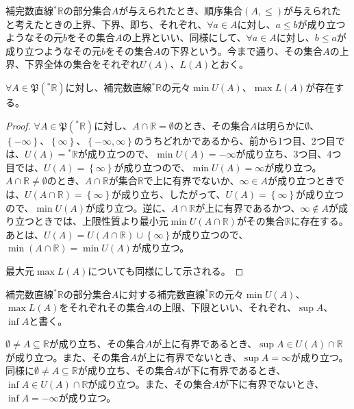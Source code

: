 \documentclass[dvipdfmx]{jsarticle}
\begin{document}
\begin{dfn}
補完数直線${}^{*}\mathbb{R}$の部分集合$A$が与えられたとき、順序集合$(A, \leq )$が与えられたと考えたときの上界、下界、即ち、それぞれ、$\forall a \in A$に対し、$a \leq b$が成り立つようなその元$b$をその集合$A$の上界といい、同様にして、$\forall a \in A$に対し、$b \leq a$が成り立つようなその元$b$をその集合$A$の下界という。今まで通り、その集合$A$の上界、下界全体の集合をそれぞれ$U(A)$、$L(A)$とおく。
\end{dfn}
\begin{thm}\label{4.1.3.1}
$\forall A \in \mathfrak{P}\left({}^{*}\mathbb{R} \right)$に対し、補完数直線${}^{*}\mathbb{R}$の元々$\min{U(A)}$、$\max{L(A)}$が存在する。
\end{thm}
\begin{proof}
$\forall A \in \mathfrak{P}\left({}^{*}\mathbb{R} \right)$に対し、$A \cap \mathbb{R} = \emptyset$のとき、その集合$A$は明らかに$\emptyset$、$\left\{ - \infty \right\}$、$\left\{ \infty \right\}$、$\left\{ - \infty,\infty \right\}$のうちどれかであるから、前から1つ目、2つ目では、$U(A) ={}^{*}\mathbb{R}$が成り立つので、$\min{U(A)} = - \infty$が成り立ち、3つ目、4つ目では、$U(A) = \left\{ \infty \right\}$が成り立つので、$\min{U(A)} = \infty$が成り立つ。$A \cap \mathbb{R} \neq \emptyset$のとき、$A \cap \mathbb{R}$が集合$\mathbb{R}$で上に有界でないか、$\infty \in A$が成り立つときでは、$U\left( A \cap \mathbb{R} \right) = \left\{ \infty \right\}$が成り立ち、したがって、$U(A) = \left\{ \infty \right\}$が成り立つので、$\min{U(A)}$が成り立つ。逆に、$A \cap \mathbb{R}$が上に有界であるかつ、$\infty \notin A$が成り立つときでは、上限性質より最小元$\min{U\left( A \cap \mathbb{R} \right)}$がその集合$\mathbb{R}$に存在する。あとは、$U(A) = U\left( A \cap \mathbb{R} \right) \cup \left\{ \infty \right\}$が成り立つので、$\min\left( A \cap \mathbb{R} \right) = \min{U(A)}$が成り立つ。\par
最大元$\max{L(A)}$についても同様にして示される。
\end{proof}
\begin{dfn}
補完数直線${}^{*}\mathbb{R}$の部分集合$A$に対する補完数直線${}^{*}\mathbb{R}$の元々$\min{U(A)}$、$\max{L(A)}$をそれぞれその集合$A$の上限、下限といい、それぞれ、$\sup A$、$\inf A$と書く。
\end{dfn}
\begin{thm}\label{4.1.3.2}
$\emptyset \neq A \subseteq \mathbb{R}$が成り立ち、その集合$A$が上に有界であるとき、$\sup A \in U(A) \cap \mathbb{R}$が成り立つ。また、その集合$A$が上に有界でないとき、$\sup A = \infty$が成り立つ。同様に$\emptyset \neq A \subseteq \mathbb{R}$が成り立ち、その集合$A$が下に有界であるとき、$\inf A \in U(A) \cap \mathbb{R}$が成り立つ。また、その集合$A$が下に有界でないとき、$\inf A = - \infty$が成り立つ。
\end{thm}
\end{document}
